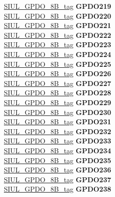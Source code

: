 \begin{DoxyCompactItemize}
\begin{tabbing}
\>\>\mbox{\hyperlink{unionSIUL__GPDO__8B__tag}{SIUL\_GPDO\_8B\_tag}} {\bfseries GPDO219}\\
\>\>\mbox{\hyperlink{unionSIUL__GPDO__8B__tag}{SIUL\_GPDO\_8B\_tag}} {\bfseries GPDO220}\\
\>\>\mbox{\hyperlink{unionSIUL__GPDO__8B__tag}{SIUL\_GPDO\_8B\_tag}} {\bfseries GPDO221}\\
\>\>\mbox{\hyperlink{unionSIUL__GPDO__8B__tag}{SIUL\_GPDO\_8B\_tag}} {\bfseries GPDO222}\\
\>\>\mbox{\hyperlink{unionSIUL__GPDO__8B__tag}{SIUL\_GPDO\_8B\_tag}} {\bfseries GPDO223}\\
\>\>\mbox{\hyperlink{unionSIUL__GPDO__8B__tag}{SIUL\_GPDO\_8B\_tag}} {\bfseries GPDO224}\\
\>\>\mbox{\hyperlink{unionSIUL__GPDO__8B__tag}{SIUL\_GPDO\_8B\_tag}} {\bfseries GPDO225}\\
\>\>\mbox{\hyperlink{unionSIUL__GPDO__8B__tag}{SIUL\_GPDO\_8B\_tag}} {\bfseries GPDO226}\\
\>\>\mbox{\hyperlink{unionSIUL__GPDO__8B__tag}{SIUL\_GPDO\_8B\_tag}} {\bfseries GPDO227}\\
\>\>\mbox{\hyperlink{unionSIUL__GPDO__8B__tag}{SIUL\_GPDO\_8B\_tag}} {\bfseries GPDO228}\\
\>\>\mbox{\hyperlink{unionSIUL__GPDO__8B__tag}{SIUL\_GPDO\_8B\_tag}} {\bfseries GPDO229}\\
\>\>\mbox{\hyperlink{unionSIUL__GPDO__8B__tag}{SIUL\_GPDO\_8B\_tag}} {\bfseries GPDO230}\\
\>\>\mbox{\hyperlink{unionSIUL__GPDO__8B__tag}{SIUL\_GPDO\_8B\_tag}} {\bfseries GPDO231}\\
\>\>\mbox{\hyperlink{unionSIUL__GPDO__8B__tag}{SIUL\_GPDO\_8B\_tag}} {\bfseries GPDO232}\\
\>\>\mbox{\hyperlink{unionSIUL__GPDO__8B__tag}{SIUL\_GPDO\_8B\_tag}} {\bfseries GPDO233}\\
\>\>\mbox{\hyperlink{unionSIUL__GPDO__8B__tag}{SIUL\_GPDO\_8B\_tag}} {\bfseries GPDO234}\\
\>\>\mbox{\hyperlink{unionSIUL__GPDO__8B__tag}{SIUL\_GPDO\_8B\_tag}} {\bfseries GPDO235}\\
\>\>\mbox{\hyperlink{unionSIUL__GPDO__8B__tag}{SIUL\_GPDO\_8B\_tag}} {\bfseries GPDO236}\\
\>\>\mbox{\hyperlink{unionSIUL__GPDO__8B__tag}{SIUL\_GPDO\_8B\_tag}} {\bfseries GPDO237}\\
\>\>\mbox{\hyperlink{unionSIUL__GPDO__8B__tag}{SIUL\_GPDO\_8B\_tag}} {\bfseries GPDO238}\\

\end{tabbing}
\end{DoxyCompactItemize}
